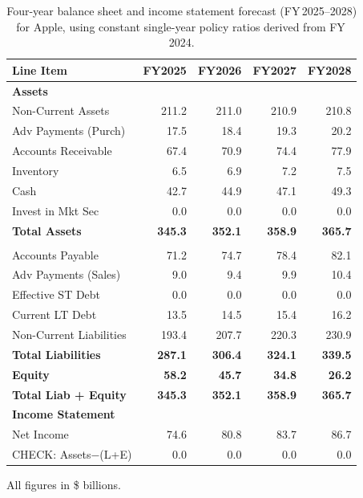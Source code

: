 \documentclass[12pt,a4paper]{article}
\begin{document}
\begin{table}[H]
\centering
\small
\begin{tabular}{l rrrr}
\toprule
\textbf{Line Item} & \textbf{FY2025} & \textbf{FY2026} & \textbf{FY2027} & \textbf{FY2028} \\
\midrule
\multicolumn{5}{l}{\textbf{Assets}} \\
Non-Current Assets      & 211.2 & 211.0 & 210.9 & 210.8 \\
Adv Payments (Purch)    &  17.5 &  18.4 &  19.3 &  20.2 \\
Accounts Receivable     &  67.4 &  70.9 &  74.4 &  77.9 \\
Inventory               &   6.5 &   6.9 &   7.2 &   7.5 \\
Cash                    &  42.7 &  44.9 &  47.1 &  49.3 \\
Invest in Mkt Sec       &   0.0 &   0.0 &   0.0 &   0.0 \\
\textbf{Total Assets}   & \textbf{345.3} & \textbf{352.1} & \textbf{358.9} & \textbf{365.7} \\
\addlinespace
\multicolumn{5}{l}{\textbf{Liabilities}} \\
Accounts Payable        &  71.2 &  74.7 &  78.4 &  82.1 \\
Adv Payments (Sales)    &   9.0 &   9.4 &   9.9 &  10.4 \\
Effective ST Debt       &   0.0 &   0.0 &   0.0 &   0.0 \\
Current LT Debt         &  13.5 &  14.5 &  15.4 &  16.2 \\
Non-Current Liabilities & 193.4 & 207.7 & 220.3 & 230.9 \\
\textbf{Total Liabilities} & \textbf{287.1} & \textbf{306.4} & \textbf{324.1} & \textbf{339.5} \\
\addlinespace
\textbf{Equity}         & \textbf{58.2} & \textbf{45.7} & \textbf{34.8} & \textbf{26.2} \\
\addlinespace
\textbf{Total Liab + Equity} & \textbf{345.3} & \textbf{352.1} & \textbf{358.9} & \textbf{365.7} \\
\midrule
\multicolumn{5}{l}{\textbf{Income Statement}} \\
Net Income              &  74.6 &  80.8 &  83.7 &  86.7 \\
\addlinespace
CHECK: Assets$-$(L+E)   &   0.0 &   0.0 &   0.0 &   0.0 \\
\bottomrule
\end{tabular}
\par\smallskip
{\footnotesize All figures in \$ billions.}
\caption{Four-year balance sheet and income statement forecast (FY\,2025--2028) for Apple, using constant single-year policy ratios derived from FY\,2024.}
\label{tab:simple_forecast_demo}
\end{table}
\end{document}

